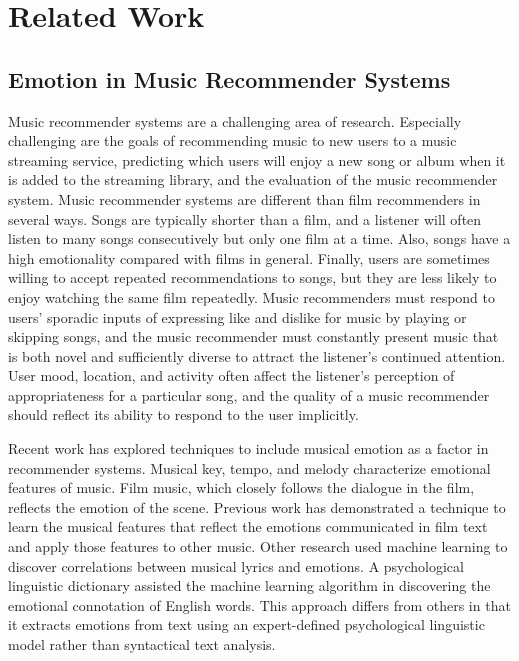\documentclass[10pt,twocolumn]{article}
\begin{document}
\section{Related Work}
\subsection{Emotion in Music Recommender Systems}
Music recommender systems are a challenging area of research.  Especially challenging are the goals of recommending music to new users to a music streaming service, predicting which users will enjoy a new song or album when it is added to the streaming library, and the evaluation of the music recommender system. \cite{a1}  Music recommender systems are different than film recommenders in several ways.  Songs are typically shorter than a film, and a listener will often listen to many songs consecutively but only one film at a time.  Also, songs have a high emotionality compared with films in general.  Finally, users are sometimes willing to accept repeated recommendations to songs, but they are less likely to enjoy watching the same film repeatedly.  Music recommenders must respond to users' sporadic inputs of expressing like and dislike for music by playing or skipping songs, and the music recommender must constantly present music that is both novel and sufficiently diverse to attract the listener's continued attention.  User mood, location, and activity often affect the listener's perception of appropriateness for a particular song, and the quality of a music recommender should reflect its ability to respond to the user implicitly.

Recent work has explored techniques to include musical emotion as a factor in recommender systems.  Musical key, tempo, and melody characterize emotional features of music.  Film music, which closely follows the dialogue in the film, reflects the emotion of the scene.  Previous work has demonstrated a technique to learn the musical features that reflect the emotions communicated in film text and apply those features to other music. \cite{a2}  Other research used machine learning to discover correlations between musical lyrics and emotions. \cite{a3}  A psychological linguistic dictionary assisted the machine learning algorithm in discovering the emotional connotation of English words.  This approach differs from others in that it extracts emotions from text using an expert-defined psychological linguistic model rather than syntactical text analysis.
\end{document}
